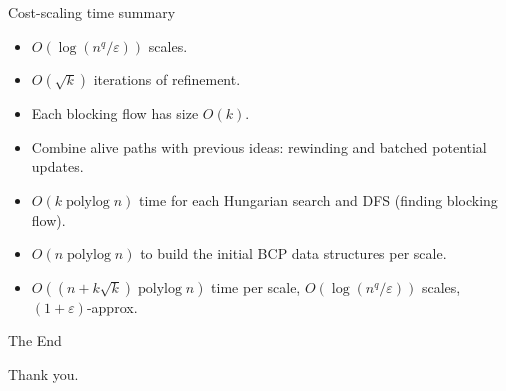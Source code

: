 \documentclass[xcolor={dvipsnames,usenames},handout]{beamer} %
\newcommand{\eps}{\varepsilon}
\DeclareMathOperator{\polylog}{polylog}
\begin{document}
\begin{frame}{Cost-scaling time summary}
\begin{itemize}
\item $O(\log(n^q/\eps))$ scales.
\item $O(\sqrt{k})$ iterations of refinement.
\item Each blocking flow has size $O(k)$.
\vspace{10pt}
\pause
\item Combine alive paths with previous ideas: rewinding and batched potential updates.
\pause
\item $O(k\polylog n)$ time for each Hungarian search and DFS (finding blocking flow).
\pause
\item $O(n\polylog n)$ to build the initial BCP data structures per scale.
\vspace{10pt}
\pause
\item $O((n+k\sqrt{k})\polylog n)$ time per scale, $O(\log(n^q/\eps))$ scales, $(1+\eps)$-approx.
\end{itemize}
\end{frame}

\begin{frame}{The End}
\begin{center}
	Thank you.
\end{center}
\end{frame}







%
%
\end{document}
